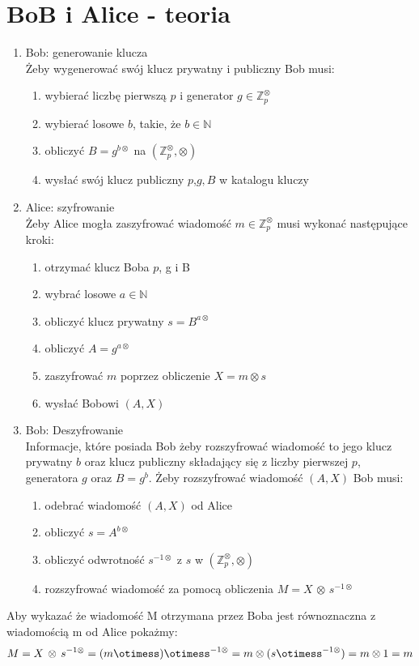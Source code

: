 \documentclass[12pt,a4paper]{article}
\begin{document}
\section{BoB i Alice - teoria}
\begin{enumerate}
    \item Bob: generowanie klucza\\
    Żeby wygenerować swój klucz prywatny i publiczny Bob musi:
    \begin{enumerate}
        \item  wybierać liczbę pierwszą $p$ i generator $g\in \mathbb{Z}^{\otimes}_{p}$
        \item wybierać losowe $b$, takie, że $b\in\mathbb{N}$
        \item  obliczyć $B=g^{b\otimes}$ na $(\mathbb{Z}^{\otimes}_{p}, \otimes)$
        \item  wysłać swój klucz publiczny $p$,$g, B$ w katalogu kluczy
        
    \end{enumerate}
    \item Alice: szyfrowanie\\
    Żeby Alice mogła zaszyfrować wiadomość $m\in \mathbb{Z}^{\otimes}_{p}$ musi wykonać następujące kroki:
    \begin{enumerate}
        \item otrzymać klucz Boba $p$, g i B
        \item wybrać losowe $a\in\mathbb{N}$
        \item obliczyć klucz prywatny $s = B^{a\otimes}$
        \item obliczyć $A = g^{a\otimes}$
        \item zaszyfrować $m$ poprzez obliczenie $X=m \otimes s$
        \item wysłać Bobowi $(A, X)$
    \end{enumerate}
    \item Bob: Deszyfrowanie\\
    Informacje, które posiada Bob żeby rozszyfrować wiadomość to jego klucz prywatny $b$ oraz klucz publiczny składający się z liczby pierwszej $p$, generatora $g$ oraz $B = g^{b}$. Żeby rozszyfrować wiadomość $(A, X)$ Bob musi:
    \begin{enumerate}
        \item odebrać wiadomość $(A, X)$ od Alice
        \item obliczyć $s=A^{b\otimes}$
        \item obliczyć odwrotność $s^{-1\otimes}$ z $s$ w $(\mathbb{Z}^{\otimes}_{p}, \otimes)$
        \item rozszyfrować wiadomość za pomocą obliczenia $M = X\,\otimes\, s^{-1\otimes}$
    \end{enumerate}
\end{enumerate}
Aby wykazać że wiadomość M otrzymana przez Boba jest równoznaczna z wiadomością m od Alice pokażmy:
\[
M=X\, \otimes \,s^{-1\otimes} = (m\otimess)\otimess^{-1\otimes}=m\otimes(s\otimess^{-1\otimes})=m\otimes1=m
\]
\end{document}
